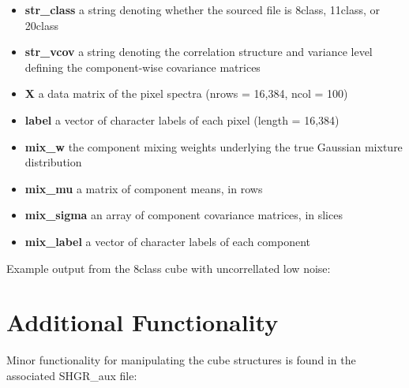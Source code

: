 \documentclass[]{article}
\newenvironment{Shaded}{\begin{snugshade}}{\end{snugshade}}
\newcommand{\CommentTok}[1]{\textcolor[rgb]{0.56,0.35,0.01}{\textit{#1}}}
\newcommand{\KeywordTok}[1]{\textcolor[rgb]{0.13,0.29,0.53}{\textbf{#1}}}
\newcommand{\NormalTok}[1]{#1}
\providecommand{\tightlist}{%
  \setlength{\itemsep}{0pt}\setlength{\parskip}{0pt}}
\begin{document}
\begin{itemize}
\tightlist
\item
  \textbf{str\_class} a string denoting whether the sourced file is 8class, 11class, or 20class
\item
  \textbf{str\_vcov} a string denoting the correlation structure and variance level defining the component-wise covariance matrices
\item
  \textbf{X} a data matrix of the pixel spectra (nrows = 16,384, ncol = 100)
\item
  \textbf{label} a vector of character labels of each pixel (length = 16,384)
\item
  \textbf{mix\_w} the component mixing weights underlying the true Gaussian mixture distribution
\item
  \textbf{mix\_mu} a matrix of component means, in rows
\item
  \textbf{mix\_sigma} an array of component covariance matrices, in slices
\item
  \textbf{mix\_label} a vector of character labels of each component
\end{itemize}

Example output from the 8class cube with uncorrellated low noise:

\begin{Shaded}
\end{Shaded}

\hypertarget{additional-functionality}{%
\section{Additional Functionality}\label{additional-functionality}}

Minor functionality for manipulating the cube structures is found in the associated SHGR\_aux file:
\end{document}
